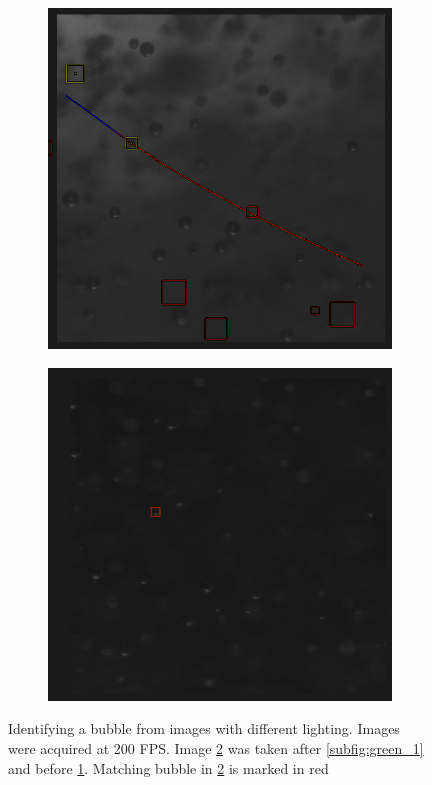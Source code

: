 \begin{figure}
\begin{subfigure}[t]{.4\textwidth}
					\includegraphics[scale=0.45]{images/tracking_green_2.png}
					\caption{}
					\label{subfig:green_2}
				\end{subfigure}

				\begin{subfigure}[t]{.55\textwidth}
					\centering
					\includegraphics[scale=0.45]{images/tracking_red.png}
					\caption{}
					\label{subfig:red}
				\end{subfigure}
								
					\caption{Identifying a bubble from images with different lighting. Images were acquired at 200 FPS. Image \ref{subfig:red} was taken after \ref{subfig:green_1} and before \ref{subfig:green_2}. Matching bubble in \ref{subfig:red} is marked in red }
					\label{fig:radius_calib_demo}
			\end{figure}
			
